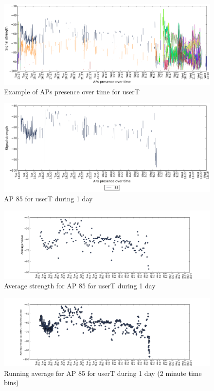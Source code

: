 \begin{figure}[!h]
\centering
\includegraphics[width
=\textwidth]{figures/rn_avg/user_1_sorted_1days_plot.png}
\caption{Example of APs presence over time for userT}
\label{user_1_APs_1d}
\end{figure}

\begin{figure}[!h]
\centering
\includegraphics[width
=\textwidth]{figures/rn_avg/user_1_sorted_85_plot.png}
\caption{AP 85 for userT during 1 day}
\label{user_1_AP85_1d}
\end{figure}

\begin{figure}[!h]
\centering
\includegraphics[width
=\textwidth]{figures/rn_avg/user_1_sorted_1days_plot_85_avg_sig.png}
\caption{Average strength for AP 85 for userT during 1 day}
\label{user_1_AP85_avg_1d}
\end{figure}

\begin{figure}[!h]
\centering
\includegraphics[width
=\textwidth]{figures/rn_avg/user_1_sorted_1days_plot_85_rn_avg_sig_2.png}
\caption{Running average for AP 85 for userT during 1 day (2 minute time bins)}
\label{user_1_AP85_rn2avg_1d}
\end{figure}

